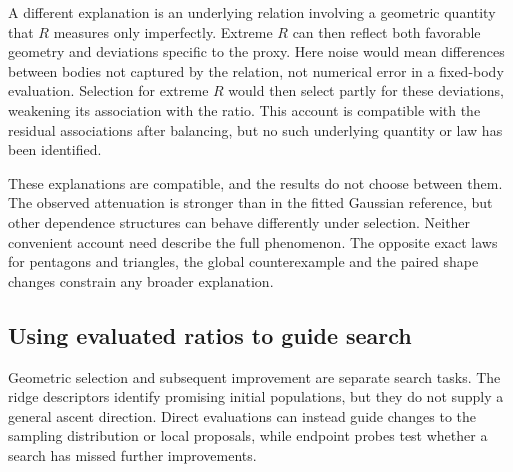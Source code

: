 A different explanation is an underlying relation involving a geometric
quantity that $R$ measures only imperfectly. Extreme $R$ can then reflect
both favorable geometry and deviations specific to the proxy. Here noise
would mean differences between bodies not captured by the relation, not
numerical error in a fixed-body evaluation. Selection for extreme $R$ would then select partly for these deviations,
weakening its association with the ratio. This account is compatible with
the residual associations after balancing, but no such underlying
quantity or law has been identified.

These explanations are compatible, and the results do not choose between
them. The observed attenuation is stronger than in the fitted Gaussian
reference, but other dependence structures can behave differently under
selection. Neither convenient account need describe the full phenomenon.
The opposite exact laws for pentagons and triangles, the global
counterexample and the paired shape changes constrain any broader
explanation.

\subsection{Using evaluated ratios to guide search}

Geometric selection and subsequent improvement are separate search tasks.
The ridge descriptors identify promising initial populations, but they do
not supply a general ascent direction. Direct evaluations can instead
guide changes to the sampling distribution or local proposals, while
endpoint probes test whether a search has missed further improvements.

